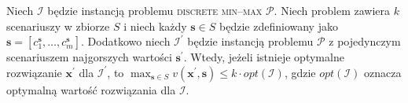 \begin{theorem}\label{th:minmaxworst}
	Niech $\mathcal{I}$ będzie instancją problemu \textsc{discrete min--max $\mathcal{P}$}. Niech problem zawiera $k$ scenariuszy w zbiorze $S$ i niech każdy $\textbf{s} \in S$ będzie zdefiniowany jako $\textbf{s} = \left[ c^{\textbf{s}}_{1}, \dots, c^{\textbf{s}}_{m} \right]$. Dodatkowo niech $\mathcal{I^{\prime}}$ będzie instancją problemu $\mathcal{P}$ z pojedynczym scenariuszem najgorszych wartości $\textbf{s}^{\prime}$. Wtedy, jeżeli istnieje optymalne rozwiązanie $\textbf{x}^{\prime}$ dla $\mathcal{I}^{\prime}$, to $\max_{\textbf{s} \in S} v \left( \textbf{x}^{\prime}, \textbf{s} \right) \leqslant k \cdot opt \left( \mathcal{I} \right)$, gdzie $opt \left( \mathcal{I} \right)$ oznacza optymalną wartość rozwiązania dla $\mathcal{I}$.
\end{theorem}

